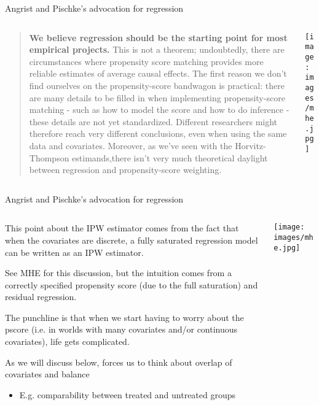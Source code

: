 \documentclass[notes,11pt, aspectratio=169]{beamer}
\newenvironment{wideitemize}{\itemize\addtolength{\itemsep}{10pt}}{\enditemize}
\begin{document}
\begin{frame}{Angrist and Pischke's advocation for regression}
\begin{columns}[T] %
  \begin{column}{.65\textwidth}
    \begin{quote}
      \textbf{We believe regression should be the starting point for most empirical projects.} This is not a theorem; undoubtedly, there are circumstances where propensity score matching provides more reliable estimates of average causal effects. The first reason we don't find ourselves on the propensity-score bandwagon is practical: there are many details to be filled in when implementing propensity-score matching - such as how to model the score and how to do inference - these details are not yet standardized. Different researchers might therefore reach very different conclusions, even when using the same data and covariates. Moreover, as we've seen with the Horvitz-Thompson estimands,there isn't very much theoretical daylight between regression and propensity-score weighting.
      \end{quote}
\end{column}%
\hfill%
\begin{column}{.35\textwidth}
\texttt{[image: images/mhe.jpg]}
\end{column}%
\end{columns}
\end{frame}


\begin{frame}{Angrist and Pischke's advocation for regression}
\begin{columns}[T] %
  \begin{column}{.65\textwidth}
    \begin{wideitemize}
    \item This point about the IPW estimator comes from the fact that
      when the covariates are discrete, a fully saturated regression
      model can be written as an IPW estimator.
    \item See MHE for this discussion, but the intuition comes from a
      correctly specified propensity score (due to the full
      saturation) and residual regression.
    \item The punchline is that when we start having to worry about
      the pscore (i.e. in worlds with many covariates and/or
      continuous covariates), life gets complicated.
    \item As we will discuss below, forces us to think about overlap of covariates and balance
      \begin{itemize}
      \item E.g. comparability between treated and untreated groups
      \end{itemize}
    \end{wideitemize}
\end{column}%
\hfill%
\begin{column}{.35\textwidth}
\texttt{[image: images/mhe.jpg]}
\end{column}%
\end{columns}
\end{frame}
\end{document}
